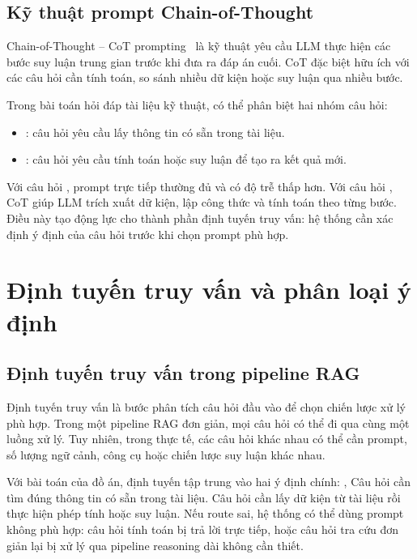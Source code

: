 \documentclass[../DoAn.tex]{subfiles}
\begin{document}
\subsection{Kỹ thuật prompt Chain-of-Thought}
\label{subsection:2.5.2}

Chain-of-Thought -- CoT prompting~\cite{wei2022cot} là kỹ thuật yêu cầu LLM thực hiện các bước suy luận trung gian trước khi đưa ra đáp án cuối. CoT đặc biệt hữu ích với các câu hỏi cần tính toán, so sánh nhiều dữ kiện hoặc suy luận qua nhiều bước.

Trong bài toán hỏi đáp tài liệu kỹ thuật, có thể phân biệt hai nhóm câu hỏi:

\begin{itemize}
\item {}: câu hỏi yêu cầu lấy thông tin có sẵn trong tài liệu.
\item {}: câu hỏi yêu cầu tính toán hoặc suy luận để tạo ra kết quả mới.
\end{itemize}

Với câu hỏi , prompt trực tiếp thường đủ và có độ trễ thấp hơn. Với câu hỏi , CoT giúp LLM trích xuất dữ kiện, lập công thức và tính toán theo từng bước. Điều này tạo động lực cho thành phần định tuyến truy vấn: hệ thống cần xác định ý định của câu hỏi trước khi chọn prompt phù hợp.

\section{Định tuyến truy vấn và phân loại ý định}
\label{section:2.6}

\subsection{Định tuyến truy vấn trong pipeline RAG}
\label{subsection:2.6.1}

Định tuyến truy vấn là bước phân tích câu hỏi đầu vào để chọn chiến lược xử lý phù hợp. Trong một pipeline RAG đơn giản, mọi câu hỏi có thể đi qua cùng một luồng xử lý. Tuy nhiên, trong thực tế, các câu hỏi khác nhau có thể cần prompt, số lượng ngữ cảnh, công cụ hoặc chiến lược suy luận khác nhau.

Với bài toán của đồ án, định tuyến tập trung vào hai ý định chính: , 
Câu hỏi  cần tìm đúng thông tin có sẵn trong tài liệu. Câu hỏi  cần lấy dữ kiện từ tài liệu rồi thực hiện phép tính hoặc suy luận. Nếu route sai, hệ thống có thể dùng prompt không phù hợp: câu hỏi tính toán bị trả lời trực tiếp, hoặc câu hỏi tra cứu đơn giản lại bị xử lý qua pipeline reasoning dài không cần thiết.
\end{document}
